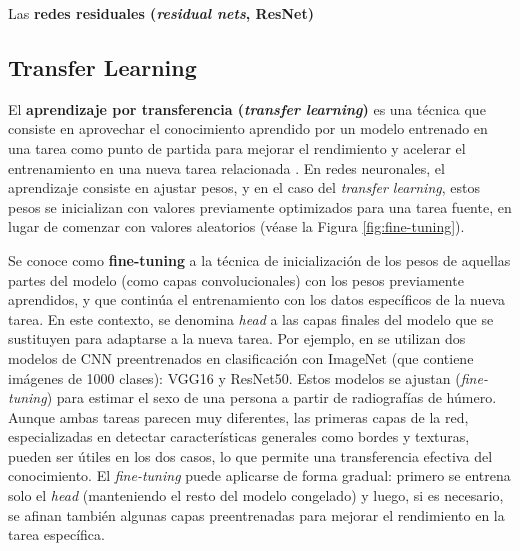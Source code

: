 Las \textbf{redes residuales (\textit{residual nets}, ResNet)} 






\subsection{Transfer Learning}

El \textbf{aprendizaje por transferencia (\textit{transfer learning})} es una técnica que consiste en 
aprovechar el conocimiento aprendido por un modelo entrenado en una tarea como punto de partida para
mejorar el rendimiento y acelerar el entrenamiento en una nueva tarea relacionada \cite{rusell2021}.
En redes neuronales, el aprendizaje consiste en ajustar pesos, y en el caso del \textit{transfer learning}, 
estos pesos se inicializan con valores previamente optimizados para una tarea fuente, en lugar de comenzar con 
valores aleatorios (véase la Figura \ref{fig:fine-tuning}).

Se conoce como \textbf{fine-tuning} a la técnica de inicialización de los pesos de aquellas partes del modelo 
(como capas convolucionales) con los pesos previamente aprendidos, y que continúa el entrenamiento con los 
datos específicos de la nueva tarea. En este contexto, se denomina \textit{head} a las capas finales del 
modelo que se sustituyen para adaptarse a la nueva tarea. 
Por ejemplo, en \cite{venema2022} se utilizan dos modelos de CNN preentrenados en clasificación con ImageNet 
(que contiene imágenes de 1000 clases): VGG16 y ResNet50. Estos modelos se ajustan (\textit{fine-tuning}) 
para estimar el sexo de una persona a partir de radiografías de húmero. Aunque ambas tareas parecen muy 
diferentes, las primeras capas de la red, especializadas en detectar características generales como bordes y 
texturas, pueden ser útiles en los dos casos, lo que permite una transferencia efectiva del conocimiento.
El \textit{fine-tuning} puede aplicarse de forma gradual: primero se entrena solo el \textit{head} 
(manteniendo el resto del modelo congelado) y luego, si es necesario, se afinan también algunas capas 
preentrenadas para mejorar el rendimiento en la tarea específica.

